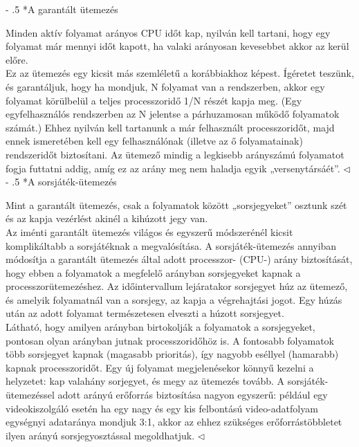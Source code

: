 \documentclass[tikz,12pt,margin=0px]{article}
\makeatletter
\renewcommand\paragraph{%
	\@startsection{paragraph}{4}{0mm}%
	{-\baselineskip}%
	{.5\baselineskip}%
	{\normalfont\normalsize\bfseries}}
\makeatother
\begin{document}
    \paragraph*{A garantált ütemezés}

    \noindent Minden aktív folyamat arányos CPU időt kap, nyilván kell tartani, hogy egy folyamat már mennyi időt kapott, ha valaki arányosan kevesebbet akkor az kerül előre.\\

    {\footnotesize \noindent {\color{blue} \faLightbulbO\ $\triangleright$ } }
    {\footnotesize
    Ez az ütemezés egy kicsit más szemléletű a korábbiakhoz képest. Ígéretet teszünk, és garantáljuk, hogy ha mondjuk, N folyamat van a rendszerben, akkor egy folyamat körülbelül a teljes processzoridő 1/N részét kapja meg. (Egy egyfelhasználós rendszerben az N jelentse a párhuzamosan működő folyamatok számát.) Ehhez nyilván kell tartanunk a már felhasznált processzoridőt, majd ennek ismeretében kell egy felhasználónak (illetve az ő folyamatainak) rendszeridőt biztosítani. Az ütemező mindig a legkisebb arányszámú folyamatot fogja futtatni addig, amíg ez az arány meg nem haladja egyik „versenytársáét”.
    $\triangleleft$ \faLightbulbO}\\

    \paragraph*{A sorsjáték-ütemezés}

    \noindent Mint a garantált ütemezés, csak a folyamatok között „sorsjegyeket” osztunk szét és az kapja vezérlést akinél a kihúzott jegy van.\\

    {\footnotesize \noindent {\color{blue} \faLightbulbO\ $\triangleright$ } }
    {\footnotesize
     Az iménti garantált ütemezés világos és egyszerű módszerénél kicsit komplikáltabb a sorsjátéknak a megvalósítása. A sorsjáték-ütemezés annyiban módosítja a garantált ütemezés által adott processzor- (CPU-) arány biztosítását, hogy ebben a folyamatok a megfelelő arányban sorsjegyeket kapnak a processzorütemezéshez. Az időintervallum lejáratakor sorsjegyet húz az ütemező, és amelyik folyamatnál van a sorsjegy, az kapja a végrehajtási jogot. Egy húzás után az adott folyamat természetesen elveszti a húzott sorsjegyet.\\

    \noindent Látható, hogy amilyen arányban birtokolják a folyamatok a sorsjegyeket, pontosan olyan arányban jutnak processzoridőhöz is. A fontosabb folyamatok több sorsjegyet kapnak (magasabb prioritás), így nagyobb eséllyel (hamarabb) kapnak processzoridőt. Egy új folyamat megjelenésekor könnyű kezelni a helyzetet: kap valahány sorjegyet, és megy az ütemezés tovább. A sorsjáték-ütemezéssel adott arányú erőforrás biztosítása nagyon egyszerű: például egy videokiszolgáló esetén ha egy nagy és egy kis felbontású video-adatfolyam egységnyi adataránya mondjuk 3:1, akkor az ehhez szükséges erőforrástöbbletet ilyen arányú sorsjegyosztással megoldhatjuk.
    $\triangleleft$ \faLightbulbO}\\
\newpage
\end{document}
